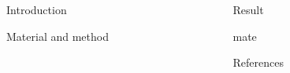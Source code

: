\documentclass[final,dvipdfmx]{beamer}
\begin{document}
\vspace{10mm}

\begin{columns}[T]
  \begin{column}{0.49\columnwidth}
    \begin{block}{\Large Introduction}
      \begin{flushleft}
        
      \end{flushleft}
    \end{block}

    \begin{block}{\Large Material and method}
      \begin{flushleft}
        
      \end{flushleft}
    \end{block}

  \end{column}

  \begin{column}{0.49\columnwidth}

    \begin{block}{\Large Result}
      \begin{flushleft}
      mate  
      \end{flushleft}
    \end{block}

    \begin{block}{\Large References}
      \begin{figure}
        \begin{flushleft}
          \beamertemplatetextbibitems
          
          
        \end{flushleft}
      \end{figure}
    \end{block}

  \end{column}

\end{columns}
\end{document}
